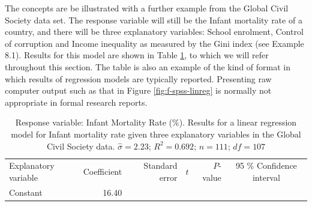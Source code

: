 \documentclass[11pt,a4paper,openany]{book}
\begin{document}
The concepts are be illustrated with a further example from the Global
Civil Society data set. The response variable will still be the Infant
mortality rate of a country, and there will be three explanatory
variables: School enrolment, Control of corruption and Income inequality
as measured by the Gini index (see Example 8.1). Results for this model
are shown in Table \ref{tab:t-imr-m2}, to which we will refer throughout
this section. The table is also an example of the kind of format in
which results of regression models are typically reported. Presenting
raw computer output such as that in Figure \ref{fig:f-spss-linreg} is
normally not appropriate in formal research reports.

\begin{longtable}[]{@{}lrrrrc@{}}
\caption{\label{tab:t-imr-m2} Response variable: Infant Mortality Rate (\%).
Results for a linear regression model for Infant mortality rate given
three explanatory variables in the Global Civil Society data.
\(\hat{\sigma}=2.23\); \(R^{2}=0.692\); \(n=111\);
\(df=107\)}\tabularnewline
\toprule
\begin{minipage}[t]{0.45\columnwidth}\raggedright\strut
Explanatory variable\strut
\end{minipage} & \begin{minipage}[t]{0.08\columnwidth}\raggedleft\strut
Coefficient\strut
\end{minipage} & \begin{minipage}[t]{0.06\columnwidth}\raggedleft\strut
Standard error\strut
\end{minipage} & \begin{minipage}[t]{0.05\columnwidth}\raggedleft\strut
\(t\)\strut
\end{minipage} & \begin{minipage}[t]{0.07\columnwidth}\raggedleft\strut
\(P\)-value\strut
\end{minipage} & \begin{minipage}[t]{0.11\columnwidth}\centering\strut
95 \% Confidence interval\strut
\end{minipage}\tabularnewline
\begin{minipage}[t]{0.45\columnwidth}\raggedright\strut
Constant\strut
\end{minipage} & \begin{minipage}[t]{0.08\columnwidth}\raggedleft\strut
16.40\strut
\end{minipage} & \begin{minipage}[t]{0.06\columnwidth}\raggedleft\strut
\strut
\end{minipage} & \begin{minipage}[t]{0.05\columnwidth}\raggedleft\strut

\end{minipage}
\end{longtable}
\end{document}

